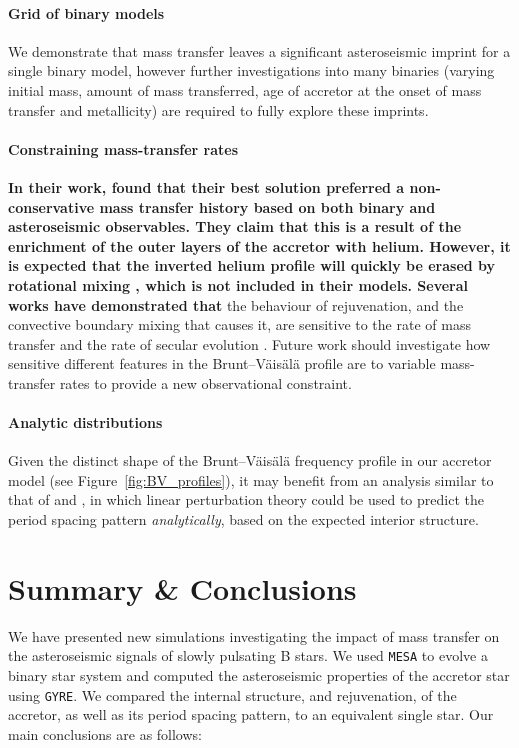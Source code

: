 \documentclass[twocolumn, twocolappendix, oneside]{aastex631}
\renewcommand{\bv}{Brunt–Väisälä\xspace}
\newcommand{\bvf}{Brunt–Väisälä frequency\xspace}
\newcommand{\mesa}{\texttt{MESA}\xspace}
\newcommand{\gyre}{\texttt{GYRE}\xspace}
\begin{document}
\paragraph{Grid of binary models} We demonstrate that mass transfer leaves a significant asteroseismic imprint for a single binary model, however further investigations into many binaries (varying initial mass, amount of mass transferred, age of accretor at the onset of mass transfer and metallicity) are required to fully explore these imprints.

\paragraph{Constraining mass-transfer rates} {\bf In their work, \citet{Miszuda+2021} found that their best solution preferred a non-conservative mass transfer history based on both binary and asteroseismic observables. They claim that this is a result of the enrichment of the outer layers of the accretor with helium. However, it is expected that the inverted helium profile will quickly be erased by rotational mixing \citep[e.g.][]{Renzo+2021}, which is not included in their models. Several works have demonstrated that} the behaviour of rejuvenation, and the convective boundary mixing that causes it, are sensitive to the rate of mass transfer and the rate of secular evolution \citep{Braun+1995,Cantiello+2007}. Future work should investigate how sensitive different features in the \bv profile are to variable mass-transfer rates to provide a new observational constraint.

\paragraph{Analytic distributions} Given the distinct shape of the \bvf profile in our accretor model (see Figure~\ref{fig:BV_profiles}), it may benefit from an analysis similar to that of \citet{Miglio+2008} and \citet{Hatta+2023}, in which linear perturbation theory could be used to predict the period spacing pattern \textit{analytically}, based on the expected interior structure.

\section{Summary \& Conclusions} \label{sec:conclusion}

We have presented new simulations investigating the impact of mass transfer on the asteroseismic signals of slowly pulsating B stars. We used \mesa to evolve a binary star system and computed the asteroseismic properties of the accretor star using \gyre. We compared the internal structure, and rejuvenation, of the accretor, as well as its period spacing pattern, to an equivalent single star. Our main conclusions are as follows:
\end{document}

